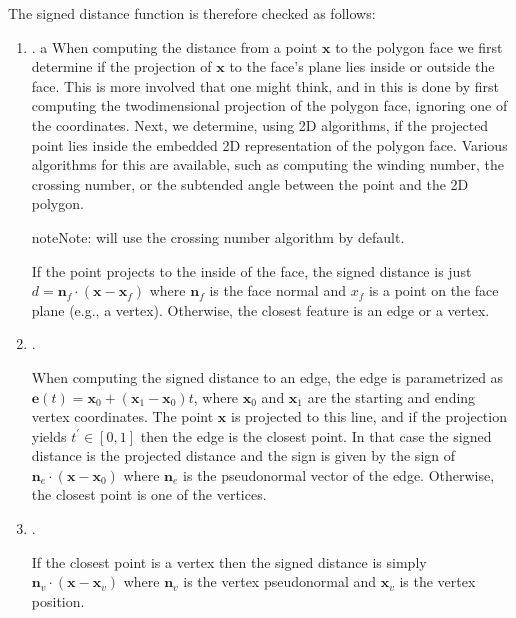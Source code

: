 \documentclass[letterpaper,10pt,english]{sphinxmanual}
\begin{document}
The signed distance function is therefore checked as follows:
\begin{enumerate}
%
\item {} 
.
a
When computing the distance from a point \(\mathbf{x}\) to the polygon face we first determine if the projection of \(\mathbf{x}\) to the face’s plane lies inside or outside the face.
This is more involved that one might think, and in  this is done by first computing the two\sphinxhyphen{}dimensional projection of the polygon face, ignoring one of the coordinates.
Next, we determine, using 2D algorithms, if the projected point lies inside the embedded 2D representation of the polygon face.
Various algorithms for this are available, such as computing the winding number, the crossing number, or the subtended angle between the point and the 2D polygon.

\begin{sphinxadmonition}{note}{Note:}
 will use the crossing number algorithm by default.
\end{sphinxadmonition}

If the point projects to the inside of the face, the signed distance is just \(d = \mathbf{n}_f\cdot\left(\mathbf{x} - \mathbf{x}_f\right)\) where \(\mathbf{n}_f\) is the face normal and \(x_f\) is a point on the face plane (e.g., a vertex).
Otherwise, the closest feature is an edge or a vertex.

\item {} 
.

When computing the signed distance to an edge, the edge is parametrized as \(\mathbf{e}(t) = \mathbf{x}_0 + \left(\mathbf{x}_1 - \mathbf{x}_0\right)t\), where \(\mathbf{x}_0\) and \(\mathbf{x}_1\) are the starting and ending vertex coordinates.
The point \(\mathbf{x}\) is projected to this line, and if the projection yields \(t^\prime \in [0,1]\) then the edge is the closest point.
In that case the signed distance is the projected distance and the sign is given by the sign of \(\mathbf{n}_e\cdot\left(\mathbf{x} - \mathbf{x}_0\right)\) where \(\mathbf{n}_e\) is the pseudonormal vector of the edge.
Otherwise, the closest point is one of the vertices.

\item {} 
.

If the closest point is a vertex then the signed distance is simply \(\mathbf{n}_v\cdot\left(\mathbf{x}-\mathbf{x}_v\right)\) where \(\mathbf{n}_v\) is the vertex pseudonormal and \(\mathbf{x}_v\) is the vertex position.

\end{enumerate}
\end{document}
